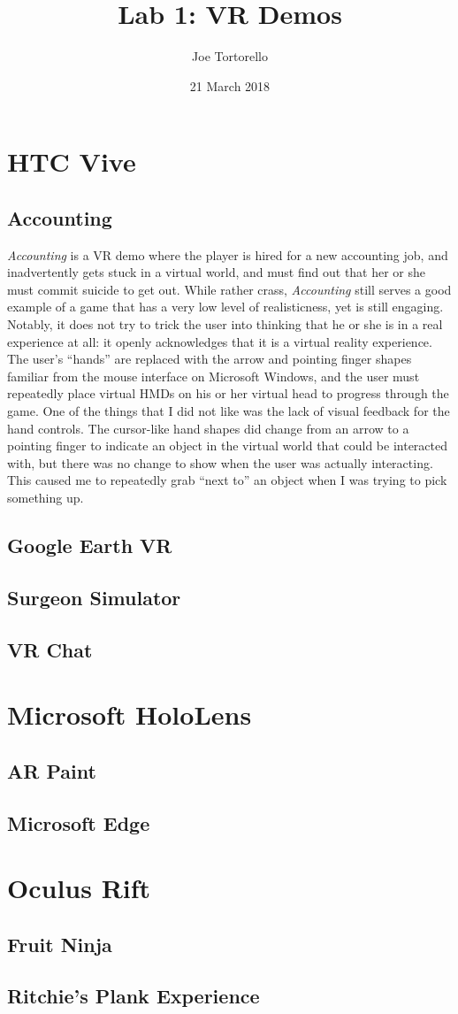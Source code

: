 \documentclass[11pt]{article}
\title{Lab 1: VR Demos}
\author{Joe Tortorello}
\date{21 March 2018}
\begin{document}
\maketitle
\section{HTC Vive}
\subsection{Accounting}
\textit{Accounting} is a VR demo where the player is hired for a new accounting job, and inadvertently gets stuck in a virtual world, and must find out that her or she must commit suicide to get out. While rather crass, \textit{Accounting} still serves a good example of a game that has a very low level of realisticness, yet is still engaging. Notably, it does not try to trick the user into thinking that he or she is in a real experience at all: it openly acknowledges that it is a virtual reality experience. The user's ``hands'' are replaced with the arrow and pointing finger shapes familiar from the mouse interface on Microsoft Windows, and the user must repeatedly place virtual HMDs on his or her virtual head to progress through the game. One of the things that I did not like was the lack of visual feedback for the hand controls. The cursor-like hand shapes did change from an arrow to a pointing finger to indicate an object in the virtual world that could be interacted with, but there was no change to show when the user was actually interacting. This caused me to repeatedly grab ``next to'' an object when I was trying to pick something up.
\subsection{Google Earth VR}
\subsection{Surgeon Simulator}
\subsection{VR Chat}
\section{Microsoft HoloLens}
\subsection{AR Paint}
\subsection{Microsoft Edge}
\section{Oculus Rift}
\subsection{Fruit Ninja}
\subsection{Ritchie's Plank Experience}
\end{document}
